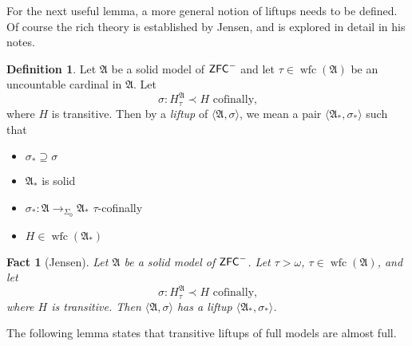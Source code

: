 \documentclass{amsart}
\newtheorem{fact}[theorem]{Fact}
\theoremstyle{definition}
\newtheorem{definition}[theorem]{Definition}
\theoremstyle{remark}
\newcommand{\ZFC}{\textup{\ensuremath{\textsf{ZFC}}}}
\DeclareMathOperator{\wfc}{wfc}
\newcommand{\To}{\longrightarrow}
\begin{document}
For the next useful lemma, a more general notion of liftups needs to be defined. Of course the rich theory is established by Jensen, and is explored in detail in his notes.
\begin{definition} Let $\mathfrak A$ be a solid model of $\ZFC^-$ and let $\tau \in \wfc(\mathfrak A)$ be an uncountable cardinal in $\mathfrak A$. Let $$\sigma: H_{\tau}^\mathfrak A \prec H \text{ cofinally,}$$ where $H$ is transitive. Then by a \textit{liftup} of $\langle \mathfrak A, \sigma\rangle$, we mean a pair $\langle {\mathfrak A}_*, \sigma_* \rangle$ such that 
\begin{itemize}
	\item $\sigma_* \supseteq \sigma$
	\item ${\mathfrak A}_*$ is solid
	\item $\sigma_*: \mathfrak A \To_{\Sigma_0} {\mathfrak A}_*$ $\tau$-cofinally
	\item $H \in \wfc({\mathfrak A}_*)$ \qedhere
\end{itemize}
\end{definition}
\begin{fact}[Jensen]\label{fact:solidliftup} Let $\mathfrak A$ be a solid model of $\ZFC^-$. Let $\tau > \omega$, $\tau \in \wfc(\mathfrak A)$, and let $$\sigma: H_{\tau}^{\mathfrak A} \prec H \text{ cofinally,}$$  where $H$ is transitive. Then $\langle \mathfrak A, \sigma \rangle$ has a liftup $\langle \mathfrak A_*, \sigma_* \rangle$.
\end{fact}

The following lemma states that transitive liftups of full models are almost full.
\end{document}
